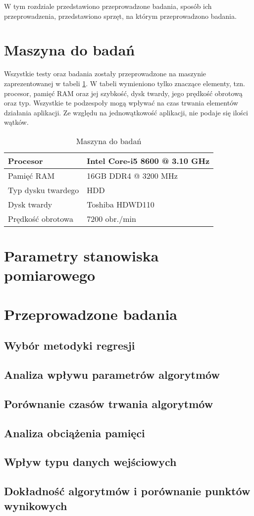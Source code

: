 W tym rozdziale przedstawiono przeprowadzone badania, sposób ich przeprowadzenia, przedstawiono sprzęt, na którym przeprowadzono badania.
\section{Maszyna do badań}
Wszystkie testy oraz badania zostały przeprowadzone na maszynie zaprezentowanej w tabeli \ref{tab:machine}. W tabeli wymieniono tylko znaczące elementy, tzn. procesor, pamięć RAM oraz jej szybkość, dysk twardy, jego prędkość obrotową oraz typ. Wszystkie te podzespoły mogą wpływać na czas trwania elementów działania aplikacji. Ze względu na jednowątkowość aplikacji, nie podaje się ilości wątków.
\begin{table}[H]
    \centering
    \begin{tabular}{|l|l|}
    \hline
    Procesor       & Intel Core-i5 8600 @ 3.10 GHz          \\ \hline
    Pamięć RAM     & 16GB DDR4 @ 3200 MHz \\ \hline
    Typ dysku twardego           & HDD              \\ \hline
    Dysk twardy         & Toshiba HDWD110              \\ \hline
    Prędkość obrotowa         & 7200 obr./min              \\ \hline
    \end{tabular}
    \caption{Maszyna do badań}
    \label{tab:machine}
\end{table}
\section{Parametry stanowiska pomiarowego}
\section{Przeprowadzone badania}
\subsection{Wybór metodyki regresji}
\label{ssec:regression}
\subsection{Analiza wpływu parametrów algorytmów}
\label{ssec:queryparameters}
\subsection{Porównanie czasów trwania algorytmów}
\label{ssec:times}
\subsection{Analiza obciążenia pamięci}
\label{ssec:memory}
\subsection{Wpływ typu danych wejściowych}
\label{ssec:entrydata}
\subsection{Dokładność algorytmów i porównanie punktów wynikowych}
